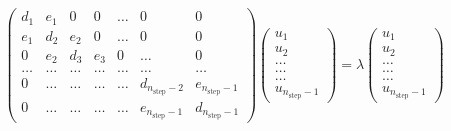 \begin{equation}
    \left( \begin{array}{ccccccc} d_1 & e_1 & 0   & 0    & \dots  &0     & 0 \\
                                e_1 & d_2 & e_2 & 0    & \dots  &0     &0 \\
                                0   & e_2 & d_3 & e_3  &0       &\dots & 0\\
                                \dots  & \dots & \dots & \dots  &\dots      &\dots & \dots\\
                                0   & \dots & \dots & \dots  &\dots       &d_{n_{\mathrm{step}}-2} & e_{n_{\mathrm{step}}-1}\\
                                0   & \dots & \dots & \dots  &\dots       &e_{n_{\mathrm{step}}-1} & d_{n_{\mathrm{step}}-1}

             \end{array} \right)      \left( \begin{array}{c} u_{1} \\
                                                              u_{2} \\
                                                              \dots\\ \dots\\ \dots\\
                                                              u_{n_{\mathrm{step}}-1}
             \end{array} \right)=\lambda \left( \begin{array}{c} u_{1} \\
                                                              u_{2} \\
                                                              \dots\\ \dots\\ \dots\\
                                                              u_{n_{\mathrm{step}}-1}
             \end{array} \right) 
      \label{eq:sematrix}
\end{equation} 



